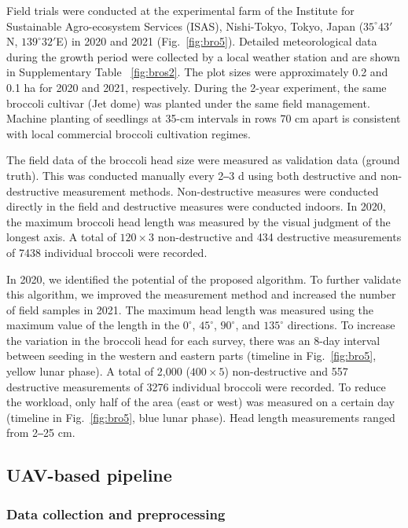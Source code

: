 Field trials were conducted at the experimental farm of the Institute for Sustainable Agro-ecosystem Services (ISAS), Nishi-Tokyo, Tokyo, Japan ($35^\circ 43'$N, $139^\circ 32'$E) in 2020 and 2021 (Fig.~\ref{fig:bro5}). Detailed meteorological data during the growth period were collected by a local weather station and are shown in Supplementary Table ~\ref{fig:bros2}. The plot sizes were approximately 0.2 and 0.1 ha for 2020 and 2021, respectively. During the 2-year experiment, the same broccoli cultivar (Jet dome) was planted under the same field management. Machine planting of seedlings at 35-cm intervals in rows 70 cm apart is consistent with local commercial broccoli cultivation regimes. 



The field data of the broccoli head size were measured as validation data (ground truth). This was conducted manually every 2‒3 d using both destructive and non-destructive measurement methods. Non-destructive measures were conducted directly in the field and destructive measures were conducted indoors. In 2020, the maximum broccoli head length was measured by the visual judgment of the longest axis. A total of $120 \times 3$ non-destructive and 434 destructive measurements of 7438 individual broccoli were recorded. 

In 2020, we identified the potential of the proposed algorithm. To further validate this algorithm, we improved the measurement method and increased the number of field samples in 2021. The maximum head length was measured using the maximum value of the length in the $0^\circ$, $45^\circ$, $90^\circ$, and $135^\circ$ directions. To increase the variation in the broccoli head for each survey, there was an 8-day interval between seeding in the western and eastern parts (timeline in Fig.~\ref{fig:bro5}, yellow lunar phase). A total of 2,000 ($400 \times 5$) non-destructive and 557 destructive measurements of 3276 individual broccoli were recorded. To reduce the workload, only half of the area (east or west) was measured on a certain day (timeline in Fig.~\ref{fig:bro5}, blue lunar phase). Head length measurements ranged from 2‒25 cm.

\subsection{UAV-based pipeline}

\subsubsection*{Data collection and preprocessing}

